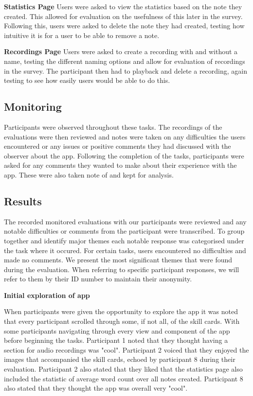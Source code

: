 \documentclass{l4proj}
\begin{document}
\textbf{Statistics Page} Users were asked to view the statistics based on the note they created. This allowed for evaluation on the usefulness of this later in the survey. Following this, users were asked to delete the note they had created, testing how intuitive it is for a user to be able to remove a note.

\textbf{Recordings Page} Users were asked to create a recording with and without a name, testing the different naming options and allow for evaluation of recordings in the survey. The participant then had to playback and delete a recording, again testing to see how easily users would be able to do this.

\subsection{Monitoring}
Participants were observed throughout these tasks. The recordings of the evaluations were then reviewed and notes were taken on any difficulties the users encountered or any issues or positive comments they had discussed with the observer about the app. Following the completion of the tasks, participants were asked for any comments they wanted to make about their experience with the app. These were also taken note of and kept for analysis.

\subsection{Results}

The recorded monitored evaluations with our participants were reviewed and any notable difficulties or comments from the participant were transcribed. To group together and identify major themes each notable response was categorised under the task where it occured. For certain tasks, users encountered no difficulties and made no comments. We present the most significant themes that were found during the evaluation. When referring to specific participant responses, we will refer to them by their ID number to maintain their anonymity.

\textbf{Initial exploration of app}

When participants were given the opportunity to explore the app it was noted that every participant scrolled through some, if not all, of the skill cards. With some participants navigating through every view and component of the app before beginning the tasks. Participant 1 noted that they thought having a section for audio recordings was "cool". Participant 2 voiced that they enjoyed the images that accompanied the skill cards, echoed by participant 8 during their evaluation. Participant 2 also stated that they liked that the statistics page also included the statistic of average word count over all notes created. Participant 8 also stated that they thought the app was overall very "cool".
\end{document}
